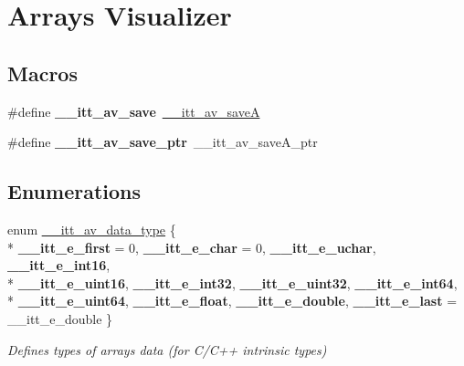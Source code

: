 \hypertarget{group__arrays}{}\section{Arrays Visualizer}
\label{group__arrays}
\subsection*{Macros}
\begin{DoxyCompactItemize}
\item 
\hypertarget{group__arrays_gaeb4215c9a934c515c6607dd9420e0413}{}\#define {\bfseries \+\_\+\+\_\+itt\+\_\+av\+\_\+save}~\hyperlink{group__arrays_ga36a1b96487c316dfa1d773fb5bf5e8af}{\+\_\+\+\_\+itt\+\_\+av\+\_\+save\+A}\label{group__arrays_gaeb4215c9a934c515c6607dd9420e0413}

\item 
\hypertarget{group__arrays_gab86c8591bc2869f08484d8a792d47b14}{}\#define {\bfseries \+\_\+\+\_\+itt\+\_\+av\+\_\+save\+\_\+ptr}~\+\_\+\+\_\+itt\+\_\+av\+\_\+save\+A\+\_\+ptr\label{group__arrays_gab86c8591bc2869f08484d8a792d47b14}

\end{DoxyCompactItemize}
\subsection*{Enumerations}
\begin{DoxyCompactItemize}
\item 
\hypertarget{group__arrays_ga5bd7ba5314d3404b24bf164e87fb3635}{}enum \hyperlink{group__arrays_ga5bd7ba5314d3404b24bf164e87fb3635}{\+\_\+\+\_\+itt\+\_\+av\+\_\+data\+\_\+type} \{ \\*
{\bfseries \+\_\+\+\_\+itt\+\_\+e\+\_\+first} = 0, 
{\bfseries \+\_\+\+\_\+itt\+\_\+e\+\_\+char} = 0, 
{\bfseries \+\_\+\+\_\+itt\+\_\+e\+\_\+uchar}, 
{\bfseries \+\_\+\+\_\+itt\+\_\+e\+\_\+int16}, 
\\*
{\bfseries \+\_\+\+\_\+itt\+\_\+e\+\_\+uint16}, 
{\bfseries \+\_\+\+\_\+itt\+\_\+e\+\_\+int32}, 
{\bfseries \+\_\+\+\_\+itt\+\_\+e\+\_\+uint32}, 
{\bfseries \+\_\+\+\_\+itt\+\_\+e\+\_\+int64}, 
\\*
{\bfseries \+\_\+\+\_\+itt\+\_\+e\+\_\+uint64}, 
{\bfseries \+\_\+\+\_\+itt\+\_\+e\+\_\+float}, 
{\bfseries \+\_\+\+\_\+itt\+\_\+e\+\_\+double}, 
{\bfseries \+\_\+\+\_\+itt\+\_\+e\+\_\+last} = \+\_\+\+\_\+itt\+\_\+e\+\_\+double
 \}\label{group__arrays_ga5bd7ba5314d3404b24bf164e87fb3635}
\begin{DoxyCompactList}\small\item\em Defines types of arrays data (for C/\+C++ intrinsic types) \end{DoxyCompactList}
\end{DoxyCompactItemize}
